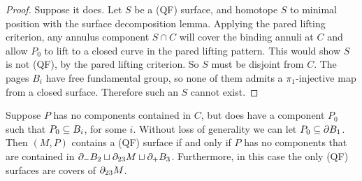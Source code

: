 \begin{proof}

Suppose it does. Let $S$ be a (QF) surface, and homotope $S$ to minimal
position with the surface decomposition lemma. Applying the pared lifting
criterion, any annulus component $S \cap C$ will cover the binding annuli at
$C$ and allow $P_0$ to lift to a closed curve in the pared lifting pattern.
This would show $S$ is not (QF), by the pared lifting criterion. So $S$ must be
disjoint from $C$.  The pages $B_i$ have free fundamental group, so none of
them admits a $\pi_1$-injective map from a closed surface.  Therefore such an
$S$ cannot exist.

\end{proof}

\begin{prop}

Suppose $P$ has no components contained in $C$, but does have a component $P_0$
such that $P_0 \subseteq B_i$, for some $i$.  Without loss of generality we can let
$P_0 \subseteq \partial B_1$.  Then $(M,P)$ contains a (QF) surface if and only if $P$
has no components that are contained in $\partial_-B_2 \sqcup \partial_{23}M \sqcup
\partial_+B_3$. Furthermore, in this case the only (QF) surfaces are covers of
$\partial_{23}M$.

\end{prop}

